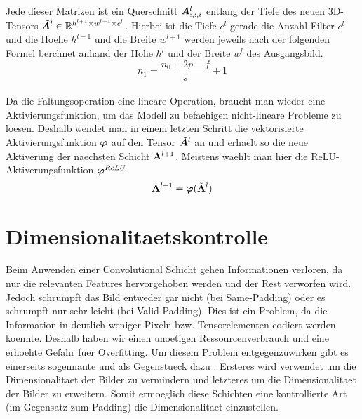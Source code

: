 \\
Jede dieser Matrizen ist ein Querschnitt $\tilde{\bm{A}}^l_{:,:,i}$ entlang der
Tiefe des neuen 3D-Tensors $\tilde{\bm{A}}^l \in \mathbb{R}^{h^{l+1} \times w^{l+1} \times c^l}$.
Hierbei ist die Tiefe $c^l$ gerade die Anzahl Filter $c^l$ und die Hoehe
$h^{l+1}$ und die Breite $w^{l+1}$ werden jeweils nach der folgenden Formel
berchnet anhand der Hohe $h^l$ und der Breite $w^l$ des Ausgangsbild.
\\
\begin{equation}
  n_1 = \frac{n_0 + 2p - f}{s} + 1
\end{equation}
\\
Da die Faltungsoperation eine lineare Operation, braucht man wieder eine
Aktivierungsfunktion, um das Modell zu befaehigen nicht-lineare Probleme zu
loesen.
Deshalb wendet man in einem letzten Schritt die vektorisierte Aktivierungsfunktion
$\bm{\varphi}$ auf den Tensor $\tilde{\bm{A}}^l$ an und erhaelt so die
neue Aktiverung der naechsten Schicht $\mathbf{A}^{l+1}$. Meistens waehlt man hier
die ReLU-Aktiverungsfunktion $\bm{\varphi}^{ReLU}$.
\begin{equation}
  \mathbf{A}^{l+1} = \bm{\varphi}(\tilde{\mathbf{A}}^l)
\end{equation}



\cite{Goodfellow-et-al-2016}

\section{Dimensionalitaetskontrolle}
Beim Anwenden einer Convolutional Schicht gehen Informationen verloren, da nur
die relevanten Features hervorgehoben werden und der Rest verworfen wird. Jedoch
schrumpft das Bild entweder gar nicht (bei Same-Padding) oder es schrumpft nur
sehr leicht (bei Valid-Padding). Dies ist ein Problem, da die Information in
deutlich weniger Pixeln bzw. Tensorelementen codiert werden koennte. Deshalb
haben wir einen unoetigen Ressourcenverbrauch und eine erhoehte Gefahr fuer
Overfitting. Um diesem Problem entgegenzuwirken gibt es einerseits sogennante
 und als Gegenstueck dazu
. Ersteres wird verwendet um die Dimensionalitaet
der Bilder zu vermindern und letzteres um die Dimensionalitaet der Bilder zu
erweitern. Somit ermoeglich diese Schichten eine kontrollierte Art (im Gegensatz zum
Padding) die Dimensionalitaet einzustellen.

